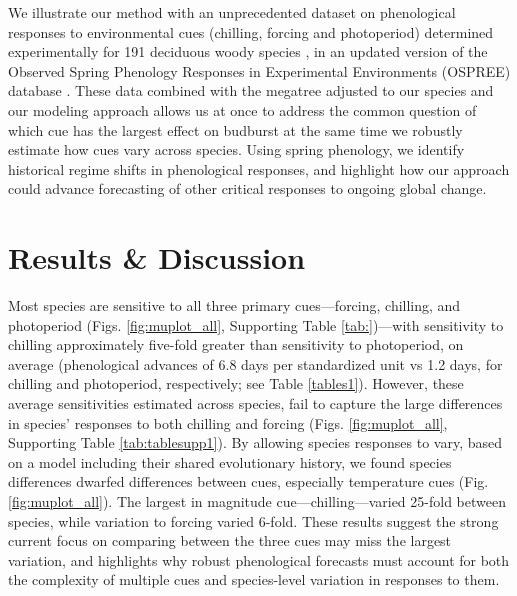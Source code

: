 \documentclass[11pt]{article}
\begin{document}
We illustrate our method with an unprecedented dataset on phenological responses to environmental cues (chilling, forcing and photoperiod) determined experimentally for 191 deciduous woody species \cite[by far the most studied group of species in phenology experiments, see][]{ettinger2020}, in an updated version of the Observed Spring Phenology Responses in Experimental Environments (OSPREE) database \citep{wolkovich2019}. These data combined with the \citet{smith2018constructing} megatree adjusted to our species and our modeling approach allows us at once to address the common question of which cue has the largest effect on budburst at the same time we robustly estimate how cues vary across species. Using spring phenology, we identify historical regime shifts \citep{uyeda2017evolution} in phenological responses, and highlight how our approach could advance forecasting of other critical responses to ongoing global change.



\section*{Results \& Discussion}

Most species are sensitive to all three primary cues---forcing, chilling, and photoperiod (Figs. \ref{fig:muplot_all}, Supporting Table \ref{tab:})\citep[see also][]{Laube:2014a,ettinger2020}---with sensitivity to chilling approximately five-fold greater than sensitivity to photoperiod, on average (phenological advances of 6.8 days per standardized unit vs 1.2 days, for chilling and photoperiod, respectively; see Table \ref{tables1}). However, these average sensitivities estimated across species, fail to capture the large differences in species' responses to both chilling and forcing (Figs. \ref{fig:muplot_all}, Supporting Table \ref{tab:tablesupp1}). By allowing species responses to vary, based on a model including their shared evolutionary history, we found species differences dwarfed differences between cues, especially temperature cues (Fig. \ref{fig:muplot_all}). The largest in magnitude cue---chilling---varied 25-fold between species, while variation to forcing varied 6-fold. These results suggest the strong current focus on comparing between the three cues may miss the largest variation, and highlights why robust phenological forecasts must account for both the complexity of multiple cues and species-level variation in responses to them.
\end{document}
